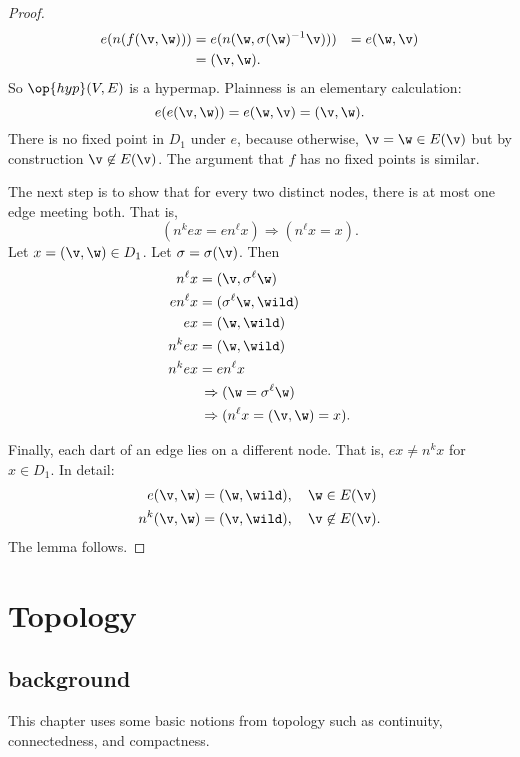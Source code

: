 \begin{proof}  
\begin{align*}
e(n(f(\v,\w))) &= e(n(\w,\sigma(\w)^{-1} \v))) &=
e(\w,\v)\\ 
&= (\v,\w).
\end{align*}
So $\op{hyp}(V,E)$ is a hypermap. 
Plainness is an elementary calculation:
\begin{displaymath}e(e(\v,\w)) = e(\w,\v) = (\v,\w).\end{displaymath}
There is no fixed point in $D_1$ under $e$, because otherwise, $\v = \w\in E(\v)$
but by construction $\v\not\in E(\v)$.  The argument that $f$ has no
fixed points is similar.

The next step is to show that for every two distinct nodes, there
is at most one edge meeting both.  That is,
\begin{displaymath}(n^k e x = e n^\ell x)\Rightarrow (n^\ell x =
x).\end{displaymath} Let $x = (\v,\w)\in D_1$.  Let
$\sigma=\sigma(\v)$. Then
\begin{align*}
n^\ell x &= (\v,\sigma^\ell \w)\\
e n^\ell x &= (\sigma^\ell \w,\wild )\\
e x &= (\w,\wild )\\
n^k e x &= (\w,\wild )\\
n^k e x &= e n^\ell x \\&\,\Rightarrow (\w = \sigma^\ell \w) \\&\,\Rightarrow
(n^\ell x = (\v,\w) = x).
\end{align*}

Finally,  each dart of an edge lies on a different node.
That is, $e x \ne n^k x$ for $x\in D_1$.   In detail:
\begin{align*}
e(\v,\w) &= (\w,\wild ),\quad \w\in E(\v)\\
n^k(\v,\w) &= (\v,\wild ),\quad \v\not\in E(\v).
\end{align*}
The lemma follows.
\end{proof}

\section{Topology}\label{sec:topology}

\subsection{background}

This chapter uses some basic
notions from topology such as continuity, connectedness, and compactness.

